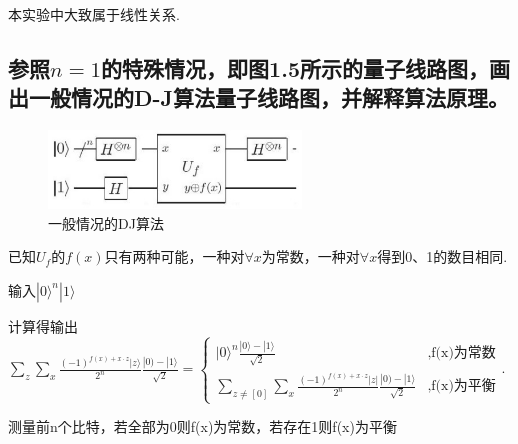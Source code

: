 \documentclass[a4paper,UTF8]{ctexart}
\begin{document}
本实验中大致属于线性关系.

\subsection{参照$n=1$的特殊情况，即图1.5所示的量子线路图，画出一般情况的D-J算法量子线路图，并解释算法原理。}

\begin{figure}[H]
    \centering
    \begin{minipage}[b]{0.9\textwidth}
        \centering
        \includegraphics[width=0.6\textwidth]{./1.jpg}
        \caption{一般情况的DJ算法}
    \end{minipage}
\end{figure}

 已知$U_f$的$f(x)$只有两种可能，一种对$\forall x$为常数，一种对$\forall x$得到0、1的数目相同.

输入$|0\rangle^n|1\rangle$

计算得输出$\sum_z\sum_x\frac{(-1)^{f(x)+x\cdot z}|z\rangle}{2^n}\frac{|0)-|1\rangle}{\sqrt2}=\left\{\begin{array}{lll}|0\rangle^n\frac{|0\rangle-|1\rangle}{\sqrt2}&\text{,f(x)为常数}\\\sum_{z\neq[0]}\sum_x\frac{(-1)^{f(x)+x\cdot z}|z|}{2^n}\frac{|0)-|1\rangle}{\sqrt2}&\text{,f(x)为平衡}\end{array}\right. .$

测量前n个比特，若全部为0则f(x)为常数，若存在1则f(x)为平衡
\end{document}
